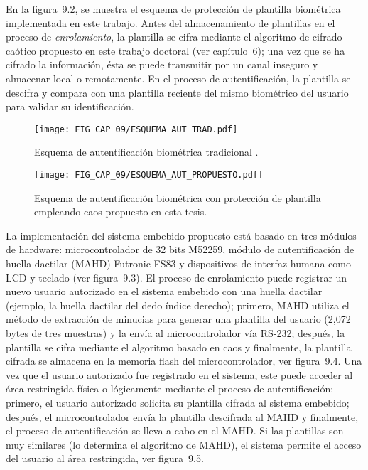 En la figura~9.2, se muestra el esquema de protección de plantilla biométrica implementada en este trabajo. Antes del almacenamiento de plantillas en el proceso de \textit{enrolamiento}, la plantilla se cifra mediante el algoritmo de cifrado caótico propuesto en este trabajo doctoral (ver capítulo~6); una vez que se ha cifrado la información, ésta se puede transmitir por un canal inseguro y almacenar local o remotamente. En el proceso de autentificación, la plantilla se descifra y compara con una plantilla reciente del mismo biométrico del usuario para validar su identificación.   \\ 

\begin{figure}[!htbp] %
	\center
	\texttt{[image: FIG\_CAP\_09/ESQUEMA\_AUT\_TRAD.pdf]}    
	\caption{Esquema de autentificación biométrica tradicional \cite{LGEtAl_2003}.}
\end{figure}      

\begin{figure}[!htbp] %
	\center
	\texttt{[image: FIG\_CAP\_09/ESQUEMA\_AUT\_PROPUESTO.pdf]}   
	\caption{Esquema de autentificación biométrica con protección de plantilla empleando caos propuesto en esta tesis.}
\end{figure}  

La implementación del sistema embebido propuesto está basado en tres módulos de hardware: microcontrolador de 32 bits M52259, módulo de autentificación de huella dactilar (MAHD) Futronic FS83 \cite{FS83} y dispositivos de interfaz humana como LCD y teclado (ver figura~9.3). El proceso de enrolamiento puede registrar un nuevo usuario autorizado en el sistema embebido con una huella dactilar (ejemplo, la huella dactilar del dedo índice derecho); primero, MAHD utiliza el método de extracción de minucias para generar una plantilla del usuario (2,072 bytes de tres muestras) y la envía al microcontrolador vía RS-232; después, la plantilla se cifra mediante el algoritmo basado en caos y finalmente, la plantilla cifrada se almacena en la memoria flash del microcontrolador, ver figura~9.4. Una vez que el usuario autorizado fue registrado en el sistema, este puede acceder al área restringida física o lógicamente mediante el proceso de autentificación: primero, el usuario autorizado solicita su plantilla cifrada al sistema embebido; después, el microcontrolador envía la plantilla descifrada al MAHD y finalmente, el proceso de autentificación se lleva a cabo en el MAHD. Si las plantillas son muy similares (lo determina el algoritmo de MAHD), el sistema permite el acceso del usuario al área restringida, ver figura~9.5.   \\

